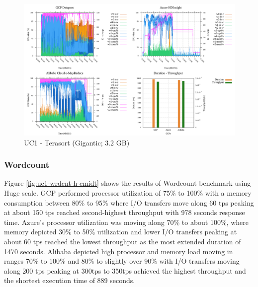 \documentclass[review]{elsarticle}
\begin{document}
	\begin{figure}[p]
		\caption{UC1 - Terasort (Gigantic; 3.2 GB)}
		\label{fig:uc1-tera-g-cmidt}
		\includegraphics[width=\textwidth]{uc1-tera-g-cmidt}
		\centering
	\end{figure}
	
	\subsubsection{Wordcount}
	Figure \ref{fig:uc1-wrdcnt-h-cmidt} shows the results of Wordcount benchmark using Huge scale.
	GCP performed processor utilization of 75\% to 100\% with a memory consumption between 80\% to 95\% where I/O transfers move along 60 tps peaking at about 150 tps reached second-highest throughput with 978 seconds response time. Azure's processor utilization was moving along 70\% to about 100\%, where memory depicted 30\% to 50\% utilization and lower I/O transfers peaking at about 60 tps reached the lowest throughput as the most extended duration of 1470 seconds. Alibaba depicted high processor and memory load moving in ranges 70\% to 100\% and 80\% to slightly over 90\% with I/O transfers moving along 200 tps peaking at 300tps to 350tps achieved the highest throughput and the shortest execution time of 889 seconds.
	
\end{document}
